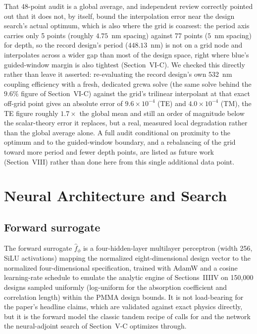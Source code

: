 \documentclass[10pt,twocolumn]{article}
\begin{document}
That 48-point audit is a global average, and independent review correctly
pointed out that it does not, by itself, bound the interpolation error near
the design search's actual optimum, which is also where the grid is
coarsest: the period axis carries only 5 points (roughly $4.75$~nm spacing)
against 77 points ($5$~nm spacing) for depth, so the record design's period
($448.13$~nm) is not on a grid node and interpolates across a wider gap
than most of the design space, right where blue's guided-window margin is
also tightest (Section~VI-C). We checked this directly rather than leave it
asserted: re-evaluating the record design's own 532~nm coupling efficiency
with a fresh, dedicated grcwa solve (the same solve behind the $9.6\%$
figure of Section~VI-C) against the grid's trilinear interpolant at that
exact off-grid point gives an absolute error of $9.6\times10^{-4}$ (TE) and
$4.0\times10^{-4}$ (TM), the TE figure roughly $1.7\times$ the global mean
and still an order of magnitude below the scalar-theory error it replaces,
but a real, measured local degradation rather than the global average
alone. A full audit conditional on proximity to the optimum and to the
guided-window boundary, and a rebalancing of the grid toward more period
and fewer depth points, are listed as future work (Section~VIII) rather
than done here from this single additional data point.

\section{Neural Architecture and Search}

\subsection{Forward surrogate}
The forward surrogate $\hat f_\phi$ is a four-hidden-layer multilayer
perceptron (width 256, SiLU activations) mapping the normalized
eight-dimensional design vector to the normalized four-dimensional
specification, trained with AdamW and a cosine learning-rate schedule to
emulate the analytic engine of Sections~III\textendash IV on
150{,}000 designs sampled uniformly (log-uniform for the absorption
coefficient and correlation length) within the
PMMA design bounds. It is not load-bearing for the paper's headline claims,
which are validated against exact physics directly, but it is the forward
model the classic tandem recipe of \cite{liu2018} calls for and the
network the neural-adjoint search of Section~V-C optimizes through.
\end{document}
